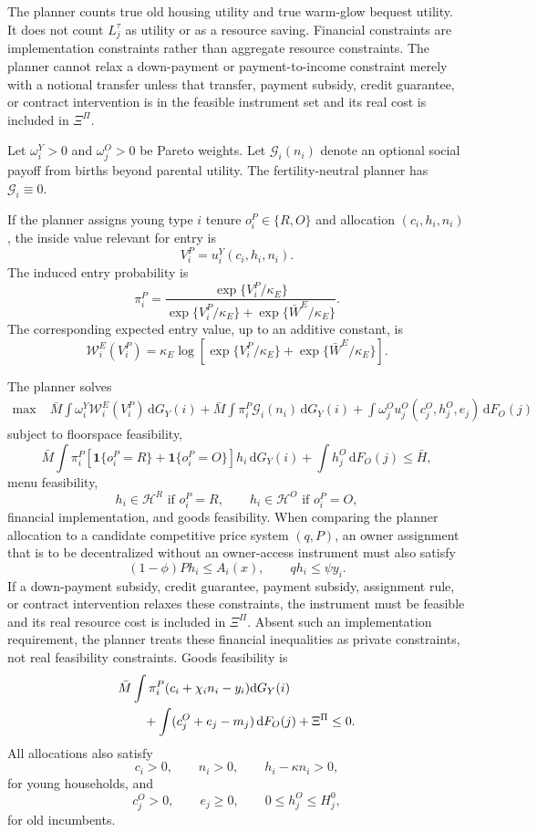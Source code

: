\documentclass[11pt]{article}
\newcommand{\dd}{\mathrm d}
\newcommand{\1}{\mathbf 1}
\newcommand{\HH}{\mathcal H}
\begin{document}
The planner counts true old housing utility and true warm-glow bequest utility. It does not count $L_j^\tau$ as utility or as a resource saving. Financial constraints are implementation constraints rather than aggregate resource constraints. The planner cannot relax a down-payment or payment-to-income constraint merely with a notional transfer unless that transfer, payment subsidy, credit guarantee, or contract intervention is in the feasible instrument set and its real cost is included in $\Xi^\Pi$.

Let $\omega_i^Y>0$ and $\omega_j^O>0$ be Pareto weights. Let $\mathcal G_i(n_i)$ denote an optional social payoff from births beyond parental utility. The fertility-neutral planner has $\mathcal G_i\equiv0$.

If the planner assigns young type $i$ tenure $o_i^P\in\{R,O\}$ and allocation $(c_i,h_i,n_i)$, the inside value relevant for entry is
\[
V_i^P=u_i^Y(c_i,h_i,n_i).
\]
The induced entry probability is
\[
\pi_i^P
=
\frac{
\exp\{V_i^P/\kappa_E\}
}{
\exp\{V_i^P/\kappa_E\}
+
\exp\{\bar W^E/\kappa_E\}
}.
\]
The corresponding expected entry value, up to an additive constant, is
\[
\mathcal W_i^E(V_i^P)
=
\kappa_E
\log
\left[
\exp\{V_i^P/\kappa_E\}
+
\exp\{\bar W^E/\kappa_E\}
\right].
\]

The planner solves
\begin{align}
\max\; &
\bar M\int
\omega_i^Y\mathcal W_i^E(V_i^P)\,\dd G_Y(i)
+
\bar M\int
\pi_i^P\mathcal G_i(n_i)\,\dd G_Y(i)
+
\int
\omega_j^O u_j^O(c_j^O,h_j^O,e_j)\,\dd F_O(j)
\label{eq:compact_planner_problem}
\end{align}
subject to floorspace feasibility,
\[
\bar M\int \pi_i^P
\left[\1\{o_i^P=R\}+\1\{o_i^P=O\}\right]h_i\,\dd G_Y(i)
+\int h_j^O\,\dd F_O(j)\le \bar H,
\]
menu feasibility,
\[
h_i\in\HH^R\text{ if }o_i^P=R,
\qquad
h_i\in\HH^O\text{ if }o_i^P=O,
\]
financial implementation, and goods feasibility. When comparing the planner allocation to a candidate competitive price system $(q,P)$, an owner assignment that is to be decentralized without an owner-access instrument must also satisfy
\[
(1-\phi)P h_i\le A_i(x),
\qquad
q h_i\le \psi y_i.
\]
If a down-payment subsidy, credit guarantee, payment subsidy, assignment rule, or contract intervention relaxes these constraints, the instrument must be feasible and its real resource cost is included in $\Xi^\Pi$. Absent such an implementation requirement, the planner treats these financial inequalities as private constraints, not real feasibility constraints. Goods feasibility is
\begin{align*}
&\bar M\int
\pi_i^P
(c_i+\chi_i n_i-y_i)\dd G_Y(i)
\notag\\
&\qquad
+
\int(c_j^O+e_j-m_j)\,\dd F_O(j)
+\Xi^\Pi
\le0.
\end{align*}
All allocations also satisfy
\[
c_i>0,\qquad n_i>0,\qquad h_i-\kappa n_i>0,
\]
for young households, and
\[
c_j^O>0,\qquad e_j\ge0,\qquad 0\le h_j^O\le H_j^0,
\]
for old incumbents.
\end{document}
